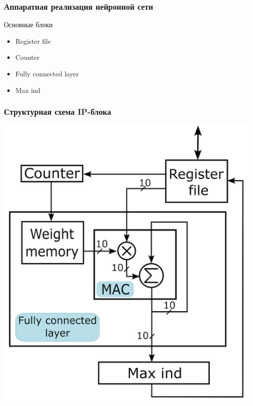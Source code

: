 \begin{frame}[t]
\frametitle{Аппаратная реализация нейронной сети}
\begin{block}{\centering Основные блоки}                
    \begin{itemize}\small
        \item Register file
        \item Counter
        \item Fully connected layer
        \item Max ind           
    \end{itemize}
\end{block}
\end{frame}
\begin{frame}[t]
    \frametitle{Структурная схема IP-блока}
    \begin{block}{}
        \vspace{1mm}
        \centering \includegraphics[height = 0.75\textheight]{pics/ip.png}
    \end{block}   
\end{frame}


